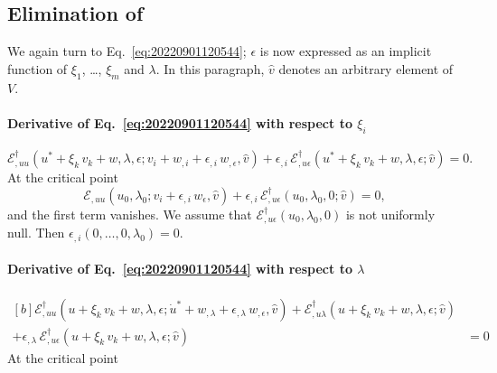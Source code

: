 \documentclass[12pt, final]{scrartcl}
\theoremstyle{definition}
\newcommand{\E}{\mathcal E}
\newcommand{\EE}{\mathcal E ^ \dagger}
\begin{document}
\subsection{Elimination of}
\label{sec:20221102134138}

We again turn to Eq.~\eqref{eq:20220901120544}; \(\epsilon\) is now expressed as an implicit function of \(\xi_1\), \dots,
\(\xi_m\) and \(\lambda\). In this paragraph, $\hat{v}$ denotes an arbitrary element of $V$.

\paragraph{Derivative of Eq.~\eqref{eq:20220901120544} with respect to \(\xi_i\)}
\begin{equation}
  \label{eq:20221102205016}
  \EE_{,uu}(u^\ast + \xi_k \, v_k + w, \lambda, \epsilon; v_i + w_{,i} + \epsilon_{,i} \, w_{,\epsilon}, \hat{v}) + \epsilon_{,i} \, \EE_{,u\epsilon}(u^\ast + \xi_k \, v_k + w, \lambda, \epsilon; \hat{v}) = 0.
\end{equation}
At the critical point
\begin{equation}
  \E_{,uu}(u_0, \lambda_0; v_i + \epsilon_{,i} \, w_\epsilon, \hat{v}) + \epsilon_{,i} \, \EE_{,u\epsilon}(u_0, \lambda_0, 0; \hat{v}) = 0,
\end{equation}
and the first term vanishes. We assume that \(\EE_{,u\epsilon}(u_0, \lambda_0, 0)\) is not uniformly null. Then
\(\epsilon_{,i}(0, \ldots, 0, \lambda_0) = 0\).

\paragraph{Derivative of Eq.~\eqref{eq:20220901120544} with respect to \(\lambda\)}
\begin{equation}
  \label{eq:20221103054732}
  \begin{aligned}[b]
    \EE_{,uu}(u + \xi_k \, v_k + w, \lambda, \epsilon; \dot{u}^\ast + w_{,\lambda} + \epsilon_{,\lambda} \, w_{,\epsilon}, \hat{v})
    + \EE_{,u\lambda}(u + \xi_k \, v_k + w, \lambda, \epsilon; \hat{v})&\\
    + \epsilon_{,\lambda} \, \EE_{,u\epsilon}(u + \xi_k \, v_k + w, \lambda, \epsilon; \hat{v}) &= 0
  \end{aligned}
\end{equation}
At the critical point
\end{document}
